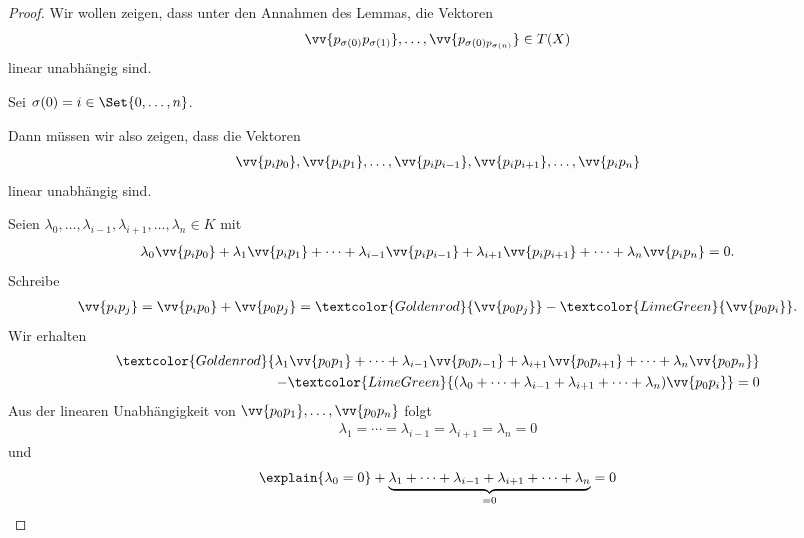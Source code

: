 \begin{proof}
    Wir wollen zeigen, dass unter den Annahmen des Lemmas, die Vektoren
    \begin{align*}
        \vv{p_{\sigma(0)}p_{\sigma(1)}},\dotsc,\vv{p_{\sigma(0)p_{\sigma(n)}}}\in T(X)
    \end{align*}
    linear unabhängig sind.

    Sei \( \sigma(0)=i\in \Set{0,\dotsc,n} \).

    Dann müssen wir also zeigen, dass die Vektoren
    \begin{align*}
        \vv{p_i p_0},\vv{p_i p_1},\dotsc, \vv{p_i p_{i-1}},\vv{p_i p_{i+1}},\dotsc,\vv{p_i p_n}
    \end{align*}
    linear unabhängig sind.

    Seien \( \lambda_0,\dotsc, \lambda_{i-1},\lambda_{i+1},\dotsc,\lambda_n\in K \) mit
    \begin{align*}
        \lambda_0 \vv{p_i p_0}+\lambda_1\vv{p_i p_1}+\dotsb+\lambda_{i-1}\vv{p_i p_{i-1}}+\lambda_{i+1}\vv{p_i p_{i+1}}+\dotsb+\lambda_n\vv{p_i p_n}=0.
    \end{align*}
    Schreibe
    \begin{align*}
        \vv{p_i p_j}=\vv{p_i p_0}+\vv{p_0 p_j}=\textcolor{Goldenrod}{\vv{p_0 p_j}}-\textcolor{LimeGreen}{\vv{p_0 p_i}}.
    \end{align*}
    Wir erhalten
    \begin{align*}
        \begin{aligned}[t]
            \textcolor{Goldenrod}{\lambda_1\vv{p_0 p_1}+\dotsb+\lambda_{i-1} \vv{p_0 p_{i-1}}+\lambda_{i+1} \vv{p_0 p_{i+1}}+\dotsb+\lambda_n \vv{p_0 p_n}}\\
            -\textcolor{LimeGreen}{(\lambda_0+\dotsb+\lambda_{i-1}+\lambda_{i+1}+\dotsb+\lambda_n)\vv{p_0 p_i}}=0
        \end{aligned}
    \end{align*}
    Aus der linearen Unabhängigkeit von \( \vv{p_0 p_1},\dotsc, \vv{p_0 p_n} \) folgt
    \begin{align*}
        \lambda_1=\dotsb=\lambda_{i-1}=\lambda_{i+1}=\lambda_n=0
    \end{align*}
    und
    \begin{align*}
            \explain{\lambda_0=0}+\underbrace{\lambda_1+\dotsb+\lambda_{i-1}+\lambda_{i+1}+\dotsb+\lambda_n}_{=0}=0
    \end{align*}
\end{proof}
